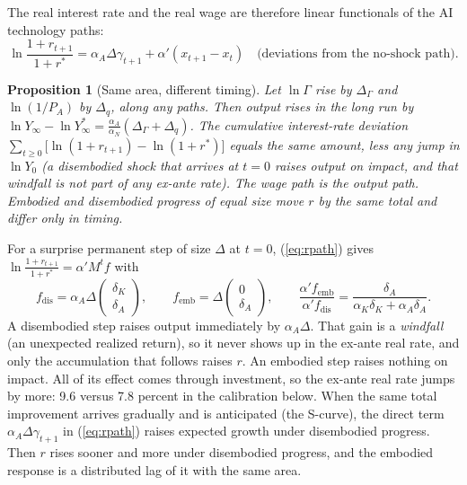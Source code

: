 \documentclass[11pt]{article}
\newtheorem{proposition}{Proposition}
\begin{document}
The real interest rate and the real wage are therefore linear functionals of the AI
technology paths:
\begin{equation}
\ln\frac{1+r_{t+1}}{1+r^*}=\alpha_A\Delta\gamma_{t+1}+\alpha'(x_{t+1}-x_t)\quad\text{(deviations from the no-shock path)}.
\label{eq:rpath}
\end{equation}

\begin{proposition}[Same area, different timing]\label{prop:area}
Let $\ln\Gamma$ rise by $\Delta_\Gamma$ and $\ln(1/P_A)$ by $\Delta_q$, along any paths.
Then output rises in the long run by $\ln Y_\infty-\ln Y_\infty^*=\frac{\alpha_A}{\alpha_N}(\Delta_\Gamma+\Delta_q)$.
The cumulative interest-rate deviation $\sum_{t\ge0}\big[\ln(1+r_{t+1})-\ln(1+r^*)\big]$
equals the same amount, less any jump in $\ln Y_0$ (a disembodied shock that arrives at
$t=0$ raises output on impact, and that windfall is not part of any ex-ante rate). The wage path is the output path. Embodied and disembodied progress
of equal size move $r$ by the same total and differ only in timing.
\end{proposition}

For a surprise permanent step of size $\Delta$ at $t=0$, (\ref{eq:rpath}) gives
$\ln\frac{1+r_{t+1}}{1+r^*}=\alpha'M^tf$ with
\begin{equation*}
f_{\text{dis}}=\alpha_A\Delta\begin{pmatrix}\delta_K\\ \delta_A\end{pmatrix},\qquad
f_{\text{emb}}=\Delta\begin{pmatrix}0\\ \delta_A\end{pmatrix},\qquad
\frac{\alpha'f_{\text{emb}}}{\alpha'f_{\text{dis}}}=\frac{\delta_A}{\alpha_K\delta_K+\alpha_A\delta_A}.
\end{equation*}
A disembodied step raises output immediately by $\alpha_A\Delta$. That gain is a
\emph{windfall} (an unexpected realized return), so it never shows up in the ex-ante
real rate, and only the accumulation that follows raises $r$. An embodied step raises
nothing on impact. All of its effect comes through investment, so the ex-ante real rate
jumps by more: 9.6 versus 7.8 percent in the calibration below. When the same total
improvement arrives gradually and is anticipated (the S-curve), the direct term
$\alpha_A\Delta\gamma_{t+1}$ in (\ref{eq:rpath}) raises expected growth under
disembodied progress. Then $r$ rises sooner and more under disembodied progress, and the
embodied response is a distributed lag of it with the same area.
\end{document}
